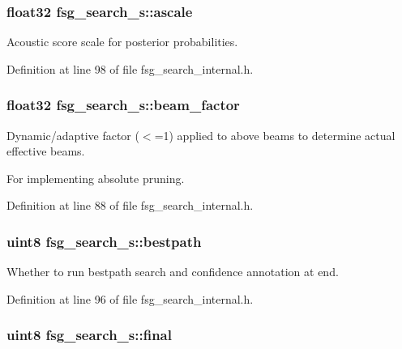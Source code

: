 \subsubsection[{ascale}]{\setlength{\rightskip}{0pt plus 5cm}float32 fsg\-\_\-search\-\_\-s\-::ascale}\label{structfsg__search__s_a4d13fff2e14882b0125386fc27a4097f}


Acoustic score scale for posterior probabilities. 



Definition at line 98 of file fsg\-\_\-search\-\_\-internal.\-h.

\subsubsection[{beam\-\_\-factor}]{\setlength{\rightskip}{0pt plus 5cm}float32 fsg\-\_\-search\-\_\-s\-::beam\-\_\-factor}\label{structfsg__search__s_a8e86d9f82189f8429d71ee2f67ecaaa2}


Dynamic/adaptive factor ($<$=1) applied to above beams to determine actual effective beams. 

For implementing absolute pruning. 

Definition at line 88 of file fsg\-\_\-search\-\_\-internal.\-h.

\subsubsection[{bestpath}]{\setlength{\rightskip}{0pt plus 5cm}uint8 fsg\-\_\-search\-\_\-s\-::bestpath}\label{structfsg__search__s_aba7eff57919c5a1de55eab3a62ff055a}


Whether to run bestpath search and confidence annotation at end. 



Definition at line 96 of file fsg\-\_\-search\-\_\-internal.\-h.

\subsubsection[{final}]{\setlength{\rightskip}{0pt plus 5cm}uint8 fsg\-\_\-search\-\_\-s\-::final}\label{structfsg__search__s_a5139d7ab35ae18407e06e78e1778f857}


